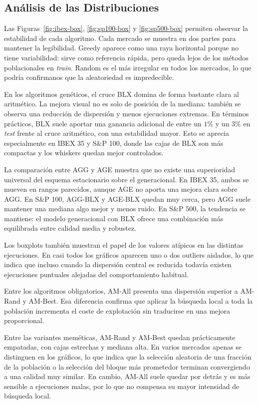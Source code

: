 \subsection{Análisis de las Distribuciones}

Las Figuras~\ref{fig:ibex-box}, \ref{fig:sp100-box} y \ref{fig:sp500-box}
permiten observar la estabilidad de cada algoritmo. Cada mercado se muestra en
dos partes para mantener la legibilidad. Greedy aparece como una raya
horizontal porque no tiene variabilidad: sirve como referencia rápida, pero
queda lejos de los métodos poblacionales en \textit{train}. Random es el más
irregular en todos los mercados, lo que podría confirmanos que la aleatoriedad es impredecible.

En los algoritmos genéticos, el cruce BLX domina de forma bastante clara al
aritmético. La mejora visual no es solo de posición de la mediana: también se
observa una reducción de dispersión y menos ejecuciones extremas. En términos
prácticos, BLX suele aportar una ganancia adicional de entre un \(1\%\) y un
\(3\%\) en \textit{test} frente al cruce aritmético, con una estabilidad mayor.
Esto se aprecia especialmente en IBEX 35 y S\&P 100, donde las cajas de BLX son
más compactas y los whiskers quedan mejor controlados.

La comparación entre AGG y AGE muestra que no existe una superioridad universal
del esquema estacionario sobre el generacional. En IBEX 35, ambos se mueven en
rangos parecidos, aunque AGE no aporta una mejora clara sobre AGG. En S\&P 100,
AGG-BLX y AGE-BLX quedan muy cerca, pero AGG suele mantener una mediana algo
mejor y menos ruido. En S\&P 500, la tendencia se mantiene: el modelo generacional
con BLX ofrece una combinación más equilibrada entre calidad media y robustez.

Los boxplots también muestran el papel de los valores atípicos en las distintas ejecuciones. En casi todos los gráficos aparecen uno o dos outliers aislados, lo que indica que incluso cuando la dispersión central es reducida todavía existen ejecuciones puntuales alejadas del comportamiento habitual. 

Entre los algoritmos obligatorios, AM-All presenta una dispersión superior a AM-Rand y AM-Best. Esa diferencia confirma que aplicar la búsqueda local a toda la población incrementa el coste de explotación sin traducirse en una mejora proporcional.

Entre las variantes meméticas, AM-Rand y AM-Best quedan prácticamente empatadas,
con cajas estrechas y mediana alta. En varios mercados apenas se distinguen en
los gráficos, lo que indica que la selección aleatoria de una fracción de la
población o la selección del bloque más prometedor terminan convergiendo a una
calidad muy similar. En cambio, AM-All suele quedar por detrás y es más sensible
a ejecuciones malas, por lo que no compensa su mayor intensidad de búsqueda
local.

